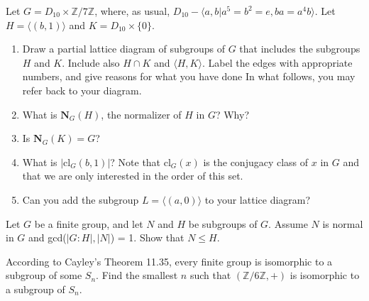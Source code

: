 \documentclass[12pt,letterpaper,boxed]{hmcpset}
\begin{document}


\begin{problem}[9.2.7]
Let $G = D_{10} \times \mathbb{Z}/7\mathbb{Z}$, where, as usual, $D_{10} - \langle a,b \vert a^5 = b^2 = e, ba = a^4b \rangle$. Let  $H = \langle (b,1) \rangle$ and $K = D_{10} \times \{0\}$.
\begin{enumerate}[label=\alph*]
\item Draw a partial lattice diagram of subgroups of $G$ that includes the subgroups $H$ and $K$. Include also $H \cap K$ and $\langle H,K \rangle$. Label the edges with appropriate numbers, and give reasons for what you have done
\newline In what follows, you may refer back to your diagram.
\item What is $\textbf{N}_G(H)$, the normalizer of $H$ in  $G$? Why?
\item Is $\textbf{N}_G(K) = G$?
\item What is $\vert \text{cl}_G(b,1) \vert$? Note that cl$_G(x)$ is the conjugacy class of $x$ in $G$ and that we are only interested in the order of this set.
\item Can you add the subgroup $L = \langle (a,0) \rangle$ to your lattice diagram?

\end{enumerate}
\end{problem}

\begin{solution}
\end{solution}

\clearpage

\begin{problem}[10.1.14]
Let  $G$ be a finite group, and let $N$ and $H$ be subgroups of $G$. Assume $N$ is normal in $G$ and gcd($\vert G:H \vert,\vert N \vert$) = 1. Show that $N \leq H$.

\end{problem}

\begin{solution}

\end{solution}

\clearpage

\begin{problem}[11.4.2]
According to Cayley's Theorem 11.35, every finite group is isomorphic to a subgroup of some $S_n$. Find the smallest $n$ such that $(\mathbb{Z}/6\mathbb{Z},+)$ is isomorphic to a subgroup of $S_n$. 
\end{problem}
\end{document}
